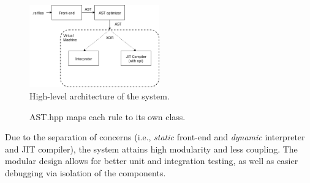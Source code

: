 {%
\begin{figure}
        \includegraphics[width=0.5\textwidth]{architecture.png}
    \caption{High-level architecture of the system.}
    \label{arch1}
\end{figure}
}
\begin{figure}[ht]
    \begin{center}
        
    \end{center}
    \caption{AST.hpp maps each rule to its own class.}
    \label{cpp1}
\end{figure}

Due to the separation of concerns (i.e., \textit{static} front-end 
and \textit{dynamic} interpreter and JIT compiler), the system attains
high modularity and less coupling. The modular design
allows for better unit and integration testing, as well as
easier debugging via isolation of the components.

